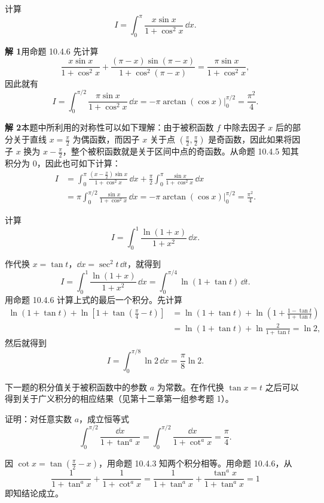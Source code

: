 \begin{xexample}[10.4.6]
计算
\[
  I=\int_0^\pi\frac{x\sin x}{1+\cos^2x}\,\dd x.
\]
\end{xexample}
\begin{xsolution}
\textbf{解 1}\quad 用命题 10.4.6 先计算
\[
  \frac{x\sin x}{1+\cos^2x}
  +\frac{(\pi-x)\sin(\pi-x)}{1+\cos^2(\pi-x)}
  =\frac{\pi\sin x}{1+\cos^2x},
\]
因此就有
\[
  I=\int_0^{\pi/2}\frac{\pi\sin x}{1+\cos^2x}\,\dd x
  =-\pi\arctan(\cos x)\Big|_0^{\pi/2}
  =\frac{\pi^2}{4}.
\]

\textbf{解 2}\quad 本题中所利用的对称性可以如下理解：由于被积函数 $f$ 中除去因子 $x$ 后的部分关于直线 $x=\frac\pi2$ 为偶函数，而因子 $x$ 关于点 $(\frac\pi2,\frac\pi2)$ 是奇函数，因此如果将因子 $x$ 换为 $x-\frac\pi2$，整个被积函数就是关于区间中点的奇函数。从命题 10.4.5 知其积分为 0，因此也可如下计算：
\begin{align*}
  I&=\int_0^\pi\frac{(x-\frac\pi2)\sin x}{1+\cos^2x}\,\dd x
    +\frac\pi2\int_0^\pi\frac{\sin x}{1+\cos^2x}\,\dd x\\
   &=\pi\int_0^{\pi/2}\frac{\sin x}{1+\cos^2x}\,\dd x
    =-\pi\arctan(\cos x)\Big|_0^{\pi/2}
    =\frac{\pi^2}{4}.
\end{align*}
\end{xsolution}

\begin{xexample}[10.4.7]
计算
\[
  I=\int_0^1\frac{\ln(1+x)}{1+x^2}\,\dd x.
\]
\end{xexample}
\begin{xsolution}
作代换 $x=\tan t$，$\dd x=\sec^2t\,\dd t$，就得到
\begin{equation}
  I=\int_0^1\frac{\ln(1+x)}{1+x^2}\,\dd x
  =\int_0^{\pi/4}\ln(1+\tan t)\,\dd t.
  \tag{10.15}
  \label{eq:10.15}
\end{equation}
用命题 10.4.6 计算上式的最后一个积分。先计算
\begin{align*}
  \ln(1+\tan t)+\ln\left[1+\tan\left(\frac\pi4-t\right)\right]
  &=\ln(1+\tan t)+\ln\left(1+\frac{1-\tan t}{1+\tan t}\right)\\
  &=\ln(1+\tan t)+\ln\frac2{1+\tan t}=\ln2,
\end{align*}
然后就得到
\[
  I=\int_0^{\pi/8}\ln2\,\dd x=\frac\pi8\ln2.
\]
\end{xsolution}

下一题的积分值关于被积函数中的参数 $a$ 为常数。在作代换 $\tan x=t$ 之后可以得到关于广义积分的相应结果（见第十二章第一组参考题 1）。

\begin{xexample}[10.4.8]
证明：对任意实数 $a$，成立恒等式
\[
  \int_0^{\pi/2}\frac{\dd x}{1+\tan^a x}
  =\int_0^{\pi/2}\frac{\dd x}{1+\cot^a x}
  =\frac\pi4.
\]
\end{xexample}
\begin{xsolution}
因 $\cot x=\tan(\frac\pi2-x)$，用命题 10.4.3 知两个积分相等。用命题 10.4.6，从
\[
  \frac1{1+\tan^a x}+\frac1{1+\cot^a x}
  =\frac1{1+\tan^a x}+\frac{\tan^a x}{1+\tan^a x}=1
\]
即知结论成立。
\end{xsolution}

